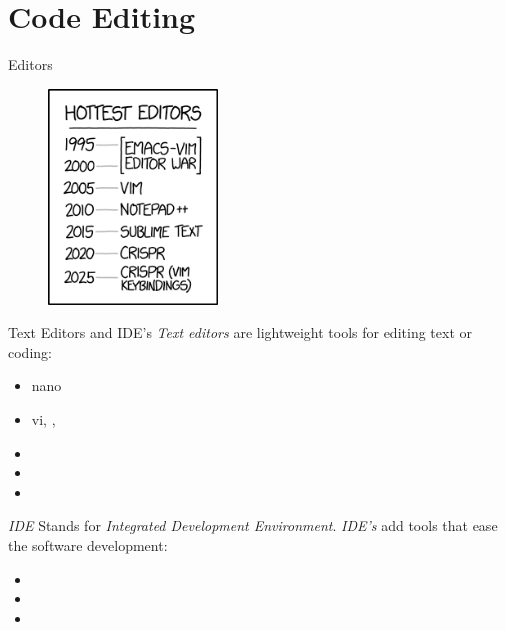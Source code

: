 \documentclass{setbeamer}
\begin{document}
\section{Code Editing}

\begin{frame}{Editors}
    \begin{figure}[h]
        \includegraphics[width=4.5cm, keepaspectratio]{./resources/hottest_editors.png}
        \caption*{}
    \end{figure}

\end{frame}

\begin{frame}{Text Editors and IDE's}
    \emph{Text editors} are lightweight tools for editing text or coding:
    \begin{itemize}
        \item nano
        \item vi, , 
        \item {}
        \item {}
        \item {}
    \end{itemize}

    \pause
    \vspace{0.3cm}

    \emph{IDE} Stands for \emph{Integrated Development Environment}. \emph{IDE's} add tools that ease the software development:
    \begin{itemize}
        \item {}
        \item {}
        \item {}
    \end{itemize}
\end{frame}
\end{document}
